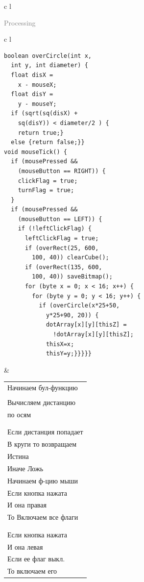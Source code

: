 \documentclass[a4paper, 12pt]{article}
\begin{document}
\begin{tabular}{c l}
\begin{flushright}\begin{huge}\textcolor{grey}{Processing}\end{huge}\end{flushright}
\begin{tabular}{c l}
  \hline
  \begin{lstlisting}[style=pmyLatexStyle]
boolean overCircle(int x, 
  int y, int diameter) {
  float disX = 
    x - mouseX;
  float disY = 
    y - mouseY;
  if (sqrt(sq(disX) + 
    sq(disY)) < diameter/2 ) {
    return true;} 
  else {return false;}}
void mouseTick() {
  if (mousePressed && 
    (mouseButton == RIGHT)) {
    clickFlag = true;
    turnFlag = true;
  }
  if (mousePressed && 
    (mouseButton == LEFT)) {
    if (!leftClickFlag) {
      leftClickFlag = true;
      if (overRect(25, 600,
        100, 40)) clearCube();
      if (overRect(135, 600,
        100, 40)) saveBitmap();
      for (byte x = 0; x < 16; x++) {
        for (byte y = 0; y < 16; y++) {
          if (overCircle(x*25+50,
            y*25+90, 20)) {
            dotArray[x][y][thisZ] = 
              !dotArray[x][y][thisZ];
            thisX=x;
            thisY=y;}}}}}
\end{lstlisting}
   &
  \begin{tabular}{l}
    Начинаем бул-функцию     \\
    \\
    Вычисляем дистанцию      \\
    по осям                  \\
    \\
    \\
    Если дистанция попадает  \\
    В круги то возвращаем    \\
    Истина                   \\
    Иначе Ложь               \\
    Начинаем ф-цию мыши      \\
    Если кнопка нажата       \\
    И она правая             \\
    То Включаем все флаги    \\
    \\
    \\
    Если кнопка нажата       \\
    И она левая              \\
    Если ее флаг выкл.       \\
    То включаем его          \\

\end{tabular}
\end{tabular}
\end{tabular}
\end{document}

